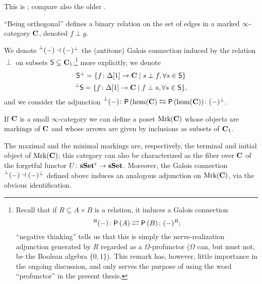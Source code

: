 \begin{remark}
This is \adef \cite[\textbf{5.2.8.1}]{HTT}; compare also the older \cite[\adef \textbf{3.1}]{JanelidzeMarkl}.
\end{remark}
\begin{remark}
``Being orthogonal'' defines a binary relation on the set of edges in a marked $\infty$\hyp{}category $\mathbf{C}$, denoted $f\perp g$.
\end{remark}
\begin{notat}
We denote $\prescript{\perp}{}{(-)}\dashv (-)^\perp$ the (antitone) Galois connection induced by the relation $\perp$ on subsets $\mathsf{S}\subseteq \mathbf{C}_1$;\footnote{Recall that if $R\subseteq A\times B$ is a relation, it induces a Galois connection $${}^{R}(-) \colon \mathsf{P}\,(A)\rightleftarrows \mathsf{P}\,(B)\colon (-)^{R};$$ ``negative thinking'' tells us that this is simply the nerve\hyp{}realization adjunction generated by $R$ regarded as a $\Omega$\hyp{}profunctor ($\Omega$ can, but must not, be the Boolean algebra $\{0,1\}$). This remark has, however, little importance in the ongoing discussion, and only serves the purpose of using the word ``profunctor'' in the present thesis.} more explicitly, we denote
\begin{gather*}
\mathsf{S}^\perp = \{f\colon \Delta[1]\to \mathbf{C}\mid s \perp f,  \forall s\in \mathsf{S}\} \\
\prescript{\perp}{}{\mathsf{S}} = \{f\colon \Delta[1]\to \mathbf{C}\mid f \perp s,  \forall s\in \mathsf{S}\},
\end{gather*}
and we consider the adjunction $\prescript{\perp}{}{(-)}\colon \mathsf{P}\,(\text{hom}(\mathbf{C})\leftrightarrows \mathsf{P}\,(\text{hom}(\mathbf{C}))\colon (-)^\perp$.
\end{notat}
\begin{definition}\label{def:mrkc}
If $\mathbf{C}$ is a small $\infty$\hyp{}category we can define a poset $\text{Mrk}(\mathbf{C})$ whose objects are markings of $\mathbf{C}$ and whose arrows are given by inclusions as subsets of $\mathbf{C}_1$.
\end{definition}
\begin{remark}
The maximal and the minimal markings are, respectively, the terminal and initial object of $\text{Mrk}(\mathbf{C})$; this category can also be characterized as the fiber over $\mathbf{C}$ of the forgetful functor $U\colon \mathbf{sSet}^\varsigma \to \mathbf{sSet}$. Moreover, the Galois connection $\prescript{\perp}{}{(-)}\dashv (-)^\perp$ defined above induces an analogous adjunction on $\text{Mrk}(\mathbf{C})$, via the obvious identification.
\end{remark}
